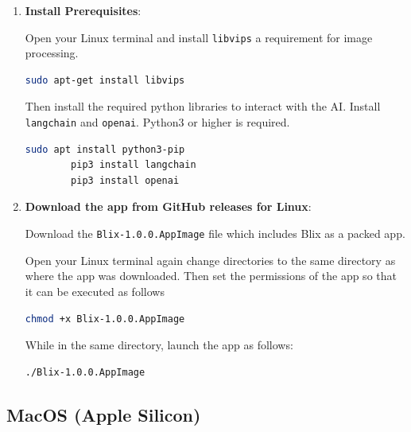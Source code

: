 \documentclass[11pt,a4paper]{article}
\def\code#1{\texttt{#1}}
\begin{document}
\begin{enumerate}[label*=\arabic*.]
	\item[\textbullet] {\bf Install Prerequisites}: 

	Open your Linux terminal and install \code{libvips} a requirement for
	image processing.

	\begin{lstlisting}[language=sh]
		sudo apt-get install libvips 
	\end{lstlisting}

	Then install the required python libraries to interact with the AI. Install
	\code{langchain} and \code{openai}. Python3 or higher is required.

	\begin{lstlisting}[language=sh]
		sudo apt install python3-pip
		pip3 install langchain
		pip3 install openai
	\end{lstlisting}

	\item[\textbullet] {\bf Download the app from GitHub releases for Linux}: 

	Download the \code{Blix-1.0.0.AppImage} file which includes Blix as a packed app.

	Open your Linux terminal again change directories to the same directory as
	where the app was downloaded. Then set the permissions of the app so that it can
	be executed as follows

	\begin{lstlisting}[language=sh]
		chmod +x Blix-1.0.0.AppImage
	\end{lstlisting}

	While in the same directory, launch the app as follows:

	\begin{lstlisting}[language=sh]
		./Blix-1.0.0.AppImage
	\end{lstlisting}
\end{enumerate}


\subsection*{MacOS (Apple Silicon)}
\end{document}
